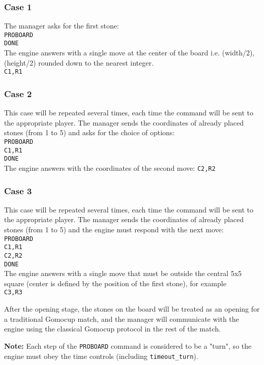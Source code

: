 \documentclass[12pt,a4paper]{article}
\begin{document}
\subsubsection{Case 1}
The manager asks for the first stone:\\
\texttt{PROBOARD}\\
\texttt{DONE}\\
The engine answers with a single move at the center of the board i.e. (width/2),(height/2) rounded down to the nearest integer. \\
\texttt{C1,R1}

\subsubsection{Case 2}
This case will be repeated several times, each time the command will be sent to the appropriate player. The manager sends the coordinates of already placed stones (from 1 to 5) and asks for the choice of options:\\
\texttt{PROBOARD}\\
\texttt{C1,R1}\\
\texttt{DONE}\\
The engine answers with the coordinates of the second move:
\texttt{C2,R2}

\subsubsection{Case 3}
This case will be repeated several times, each time the command will be sent to the appropriate player. The manager sends the coordinates of already placed stones (from 1 to 5) and the engine must respond with the next move:\\
\texttt{PROBOARD}\\
\texttt{C1,R1}\\
\texttt{C2,R2}\\
\texttt{DONE}\\
The engine answers with a single move that must be outside the central 5x5 square (center is defined by the position of the first stone), for example\\
\texttt{C3,R3}

After the opening stage, the stones on the board will be treated as an opening for a traditional Gomocup match, and the manager will communicate with the engine using the classical Gomocup protocol in the rest of the match.

\textbf{Note:} Each step of the \texttt{PROBOARD} command is considered to be a "turn", so the engine must obey the time controls (including \texttt{timeout{\_}turn}).
\end{document}
